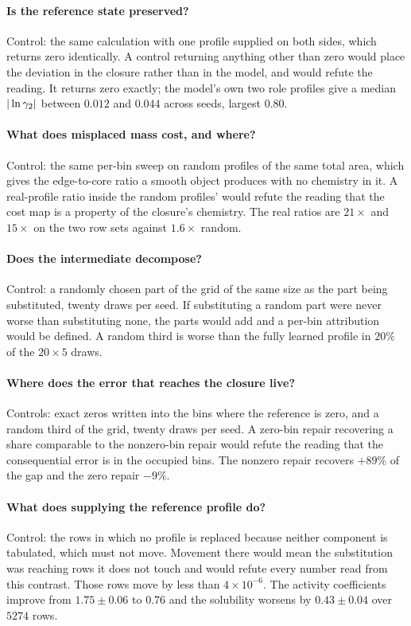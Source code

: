 \paragraph{Is the reference state preserved?}
Control: the same calculation with one profile supplied on both sides, which returns zero
identically. A control returning anything other than zero would place the deviation in the closure
rather than in the model, and would refute the reading. It returns zero exactly; the model's own
two role profiles give a median $|\ln\gamma_2|$ between $0.012$ and $0.044$ across seeds, largest $0.80$.

\paragraph{What does misplaced mass cost, and where?}
Control: the same per-bin sweep on random profiles of the same total area, which gives the
edge-to-core ratio a smooth object produces with no chemistry in it. A real-profile ratio inside
the random profiles' would refute the reading that the cost map is a property of the closure's
chemistry. The real ratios are $21\times$ and $15\times$ on the two row sets against $1.6\times$
random.

\paragraph{Does the intermediate decompose?}
Control: a randomly chosen part of the grid of the same size as the part being substituted, twenty
draws per seed. If substituting a random part were never worse than substituting none, the parts
would add and a per-bin attribution would be defined. A random third is worse than the fully
learned profile in $20\%$ of the $20\times5$ draws.

\paragraph{Where does the error that reaches the closure live?}
Controls: exact zeros written into the bins where the reference is zero, and a random third of the
grid, twenty draws per seed. A zero-bin repair recovering a share comparable to the nonzero-bin
repair would refute the reading that the consequential error is in the occupied bins. The nonzero
repair recovers $+89\%$ of the gap and the zero repair $-9\%$.

\paragraph{What does supplying the reference profile do?}
Control: the rows in which no profile is replaced because neither component is tabulated, which
must not move. Movement there would mean the substitution was reaching rows it does not touch and
would refute every number read from this contrast. Those rows move by less than
$4\times10^{-6}$. The activity coefficients improve from $1.75\pm0.06$ to $0.76$ and the solubility
worsens by $0.43\pm0.04$ over $5274$ rows.

